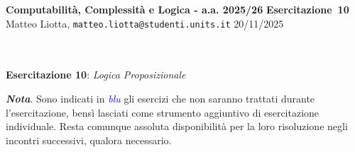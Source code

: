 \documentclass[a4paper,10pt]{article}
\makeatletter
\newcommand{\EsercitazioneNum}{10}
\newcommand{\Data}{20/11/2025}
\newcommand{\DocType}{Esercitazione} %
\newcommand{\FullTitle}{\DocType\ \EsercitazioneNum}
\newcommand{\Header}{
\noindent
  \small \textbf{Computabilità, Complessità e Logica - a.a. 2025/26} \hfill \textbf{\FullTitle} \\[0.2cm]
  \scriptsize Matteo Liotta, \texttt{matteo.liotta@studenti.units.it} \hfill \Data \\[0.2cm]
  \noindent\makebox[\linewidth]{\rule{\linewidth}{0.4pt}} \\[0.3cm]}
\makeatother
\begin{document}
\footnotesize  %
\Header\\[0.7cm]



    
    
    \noindent\Large \textbf{Esercitazione 10}: \textit{Logica Proposizionale}
    \begin{osservazioni}
        \textbf{\textit{Nota}}. Sono indicati in \textcolor{blue}{\textit{blu}} gli esercizi che non saranno trattati durante l'esercitazione, bensì lasciati come strumento aggiuntivo di esercitazione individuale. Resta comunque assoluta disponibilità per la loro risoluzione negli incontri successivi, qualora necessario.
    \end{osservazioni}
    
\end{document}
